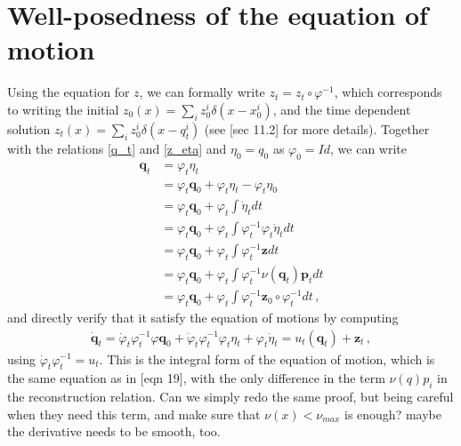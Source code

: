 \documentclass[runningheads]{llncs}
\begin{document}
\section{Well-posedness of the equation of motion}
Using the equation for $z$, we can formally write $z_t = z_t \circ \varphi^{-1}$,
which corresponds to writing the initial $z_0(x) = \sum_i z_0^i\delta(x-x_0^i)$, 
and the time dependent solution $z_t(x) = \sum_i z_0^i\delta(x-q_t^i)$ (see 
\cite{holm2009euler}[sec 11.2] for more details). Together with the relations 
\eqref{q_t} and \eqref{z_eta} and $\eta_0 = q_0$ as $\varphi_0 = Id$, we can write
\begin{align*}
  \mathbf q_t &= \varphi_t \eta_t\\
   &= \varphi_t \mathbf q_0 + \varphi_t \eta_t-\varphi_t \eta_0\\
   &= \varphi_t \mathbf q_0 + \varphi_t \int \dot \eta_t dt\\
   &= \varphi_t \mathbf q_0 + \varphi_t \int \varphi_t^{-1} \varphi_t\dot \eta_t dt\\
   &= \varphi_t \mathbf q_0 + \varphi_t \int  \varphi_t^{-1}\mathbf z dt \\
   &= \varphi_t \mathbf q_0 + \varphi_t \int  \varphi_t^{-1}\nu(\mathbf q_t) \mathbf p_t  dt\\
   &= \varphi_t \mathbf q_0 + \varphi_t \int  \varphi_t^{-1}\mathbf z_0\circ \varphi_t^{-1} dt\, , 
\end{align*}
and directly verify that it satisfy the equation of motions by computing
\begin{align*}
  \dot {\mathbf q}_t = \dot \varphi_t \varphi_t^{-1} \varphi \mathbf q_0 + \dot
  \varphi_t \varphi_t^{-1} \varphi_t \eta_t + \varphi_t \dot \eta_t  = u_t(
  \mathbf q_t) + \mathbf z_t\, ,
\end{align*}
using $\dot \varphi_t\varphi_t^{-1} = u_t$. 
This is the integral form of the equation of motion, which is the same equation
as in \cite{holm2009euler}[eqn 19], with the only difference in the term $\nu(q) p_i$ 
in the reconstruction relation. 
{\color{red} Can we simply redo the same proof, but being careful when they need this term, 
and make sure that $\nu(x)<\nu_{max}$ is enough? maybe the derivative needs to be smooth, too. }



\end{document}
